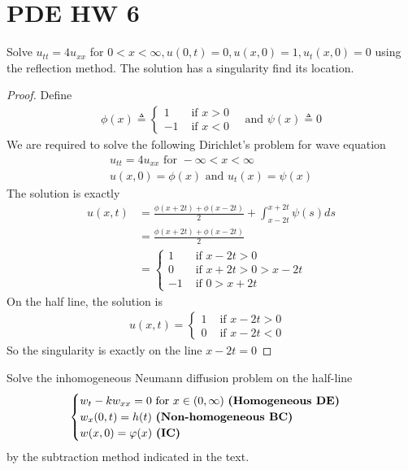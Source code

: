\documentclass{report}
\begin{document}
\section{PDE HW 6}
\begin{question}{}{}
Solve $u_{tt}=4u_{xx}$ for $0<x<\infty,u(0,t)=0,u(x,0)=1,u_t(x,0)=0$ using the reflection method. The solution has a singularity find its location. 
\end{question}
\begin{proof}
Define 
\begin{align*}
\phi (x)\triangleq \begin{cases}
  1& \text{ if $x>0$ }\\
  -1& \text{ if $x<0$ }
\end{cases}\text{ and }\psi (x)\triangleq 0
\end{align*}
We are required to solve the following Dirichlet's problem for wave equation 
\begin{align*}
u_{tt}=4u_{xx}\text{ for }-\infty < x< \infty \\
u(x,0)=\phi (x)\text{ and }u_t(x)=\psi (x)
\end{align*}
The solution is exactly 
\begin{align*}
u(x,t)&=\frac{\phi(x+2t)+\phi (x-2t)}{2}+\int_{x-2t}^{x+2t} \psi (s)ds \\
&=\frac{\phi (x+2t)+\phi (x-2t)}{2}\\
&=\begin{cases}
  1& \text{ if $x-2t>0$ }\\
  0& \text{ if  }x+2t>0>x-2t\\
  -1& \text{ if  }0>x+2t
\end{cases}
\end{align*}
On the half line, the solution is 
\begin{align*}
u(x,t)=\begin{cases}
  1& \text{ if $x-2t>0$ }\\
  0& \text{ if $x-2t<0$ }
\end{cases}
\end{align*}
So the singularity is exactly on the line $x-2t=0$ 
\end{proof}
\begin{question}{}{}
Solve the inhomogeneous Neumann diffusion problem on the half-line
\begin{align*}
\begin{cases}
  w_t-kw_{xx}=0\text{ for }x\in (0,\infty)\text{ \textbf{(Homogeneous DE)}}\\
  w_x(0,t)=h(t)\text{ \textbf{(Non-homogeneous BC)} }\\
  w(x,0)= \phi (x) \text{ \textbf{(IC)} }
\end{cases}
\end{align*}
by the subtraction method indicated in the text.
\end{question}
\end{document}
